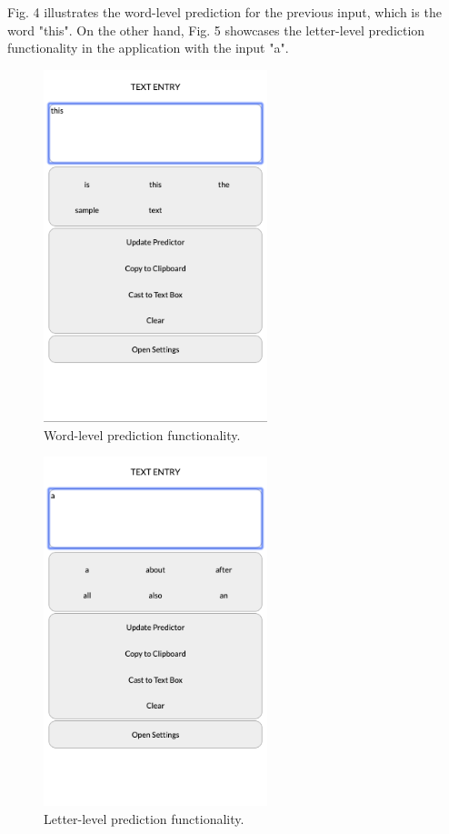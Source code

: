 \documentclass[journal]{./IEEE/IEEEtran}
\begin{document}
Fig. 4 illustrates the word-level prediction for the previous input, which is the word "this". On the other hand, Fig. 5 showcases the letter-level prediction functionality in the application with the input "a".

\begin{figure}[!ht]
\begin{center}

\includegraphics[width=65mm]{images/word-level-prediction.png}
\caption{Word-level prediction functionality.}

\end{center}
\end{figure}

\begin{figure}[!ht]
\begin{center}

\includegraphics[width=65mm]{images/letter-level-prediction.png}
\caption{Letter-level prediction functionality.}

\end{center}
\end{figure}
\end{document}
